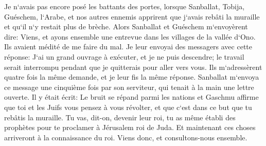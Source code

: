 \verse Je n`avais pas encore posé les battants des portes, lorsque Sanballat, Tobija, Guéschem, l`Arabe, et nos autres ennemis apprirent que j`avais rebâti la muraille et qu`il n`y restait plus de brèche. 
\verse Alors Sanballat et Guéschem m`envoyèrent dire: Viens, et ayons ensemble une entrevue dans les villages de la vallée d`Ono. Ils avaient médité de me faire du mal. 
\verse Je leur envoyai des messagers avec cette réponse: J`ai un grand ouvrage à exécuter, et je ne puis descendre; le travail serait interrompu pendant que je quitterais pour aller vers vous. 
\verse Ils m`adressèrent quatre fois la même demande, et je leur fis la même réponse. 
\verse Sanballat m`envoya ce message une cinquième fois par son serviteur, qui tenait à la main une lettre ouverte. 
\verse Il y était écrit: Le bruit se répand parmi les nations et Gaschmu affirme que toi et les Juifs vous pensez à vous révolter, et que c`est dans ce but que tu rebâtis la muraille. Tu vas, dit-on, devenir leur roi, 
\verse tu as même établi des prophètes pour te proclamer à Jérusalem roi de Juda. Et maintenant ces choses arriveront à la connaissance du roi. Viens donc, et consultons-nous ensemble. 
